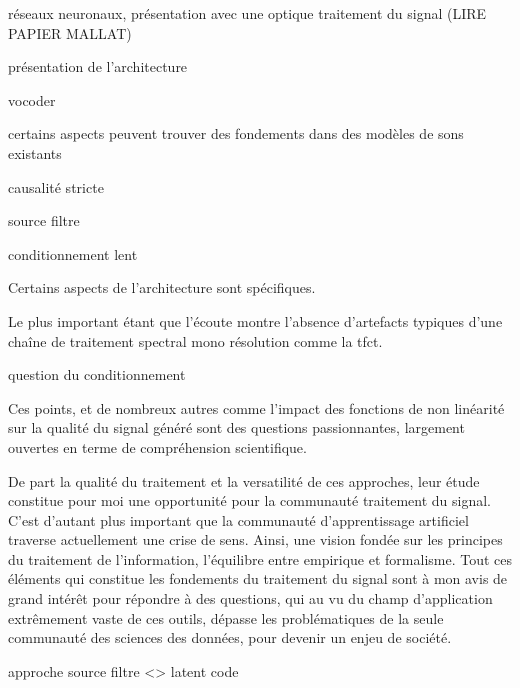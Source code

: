   réseaux neuronaux, présentation avec une optique traitement du signal (LIRE PAPIER MALLAT) 

présentation de l'architecture

vocoder

certains aspects peuvent trouver des fondements dans des modèles de sons existants

causalité stricte

source filtre

conditionnement lent

Certains aspects de l'architecture sont spécifiques.

Le plus important étant que l'écoute montre l'absence d'artefacts typiques d'une chaîne de traitement spectral mono résolution comme la tfct.

question du conditionnement



Ces points, et de nombreux autres comme l'impact des fonctions de non linéarité sur la qualité du signal généré sont des questions passionnantes, largement ouvertes en terme de compréhension scientifique.

De part la qualité du traitement et la versatilité de ces approches, leur étude constitue pour moi une opportunité pour la communauté traitement du signal. C'est d'autant plus important que la communauté d'apprentissage artificiel traverse actuellement une crise de sens. Ainsi, une vision fondée sur les principes du traitement de l'information, l'équilibre entre empirique et formalisme. Tout ces éléments qui constitue les fondements du traitement du signal sont à mon avis de grand intérêt pour répondre à des questions, qui au vu du champ d'application extrêmement vaste de ces outils, dépasse les problématiques de la seule communauté des sciences des données, pour devenir un enjeu de société.


approche source filtre <> latent code
